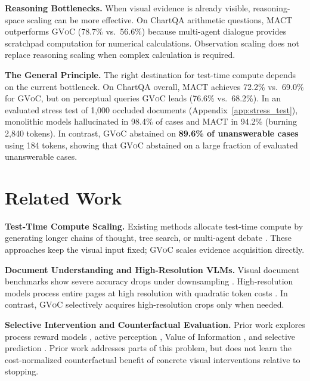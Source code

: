 \documentclass[11pt]{article}
\begin{document}
\textbf{Reasoning Bottlenecks.} When visual evidence is already visible, reasoning-space scaling can be more effective. On ChartQA arithmetic questions, MACT outperforms \textsc{GVoC} (78.7\% vs.\ 56.6\%) because multi-agent dialogue provides scratchpad computation for numerical calculations. Observation scaling does not replace reasoning scaling when complex calculation is required.

\textbf{The General Principle.} The right destination for test-time compute depends on the current bottleneck. On ChartQA overall, MACT achieves 72.2\% vs.\ 69.0\% for \textsc{GVoC}, but on perceptual queries \textsc{GVoC} leads (76.6\% vs.\ 68.2\%). In an evaluated stress test of 1,000 occluded documents (Appendix~\ref{app:stress_test}), monolithic models hallucinated in 98.4\% of cases and MACT in 94.2\% (burning 2,840 tokens). In contrast, \textsc{GVoC} abstained on \textbf{89.6\% of unanswerable cases} using 184 tokens, showing that \textsc{GVoC} abstained on a large fraction of evaluated unanswerable cases.

\section{Related Work}
\label{sec:related_work}

\textbf{Test-Time Compute Scaling.} Existing methods allocate test-time compute by generating longer chains of thought, tree search, or multi-agent debate \citep{snell2024scaling, tong2026diversity, wan2026testtimesurvey, yu2025visual, tableqa2025naacl}. These approaches keep the visual input fixed; \textsc{GVoC} scales evidence acquisition directly.

\textbf{Document Understanding and High-Resolution VLMs.} Visual document benchmarks show severe accuracy drops under downsampling \citep{mathew2021docvqa, masry2022chartqa, tablebench2024, wang2024mmlongbenchdoc}. High-resolution models process entire pages at high resolution with quadratic token costs \citep{ye2023ureader, liu2024llavanext, blecher2023nougat}. In contrast, \textsc{GVoC} selectively acquires high-resolution crops only when needed.

\textbf{Selective Intervention and Counterfactual Evaluation.} Prior work explores process reward models \citep{lightman2023verify, internvl2025visualprm}, active perception \citep{bajcsy1988active, suris2023vipergpt}, Value of Information \citep{howard1966information, horvitz1988reasoning}, and selective prediction \citep{geifman2017selective, kamath2020selective}. Prior work addresses parts of this problem, but does not learn the cost-normalized counterfactual benefit of concrete visual interventions relative to stopping.
\end{document}
